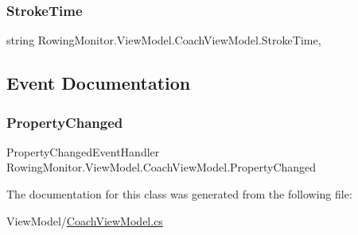 \subsubsection{\texorpdfstring{Stroke\+Time}{StrokeTime}}
{\footnotesize\ttfamily string Rowing\+Monitor.\+View\+Model.\+Coach\+View\+Model.\+Stroke\+Time\hspace{0.3cm}{\ttfamily [get]}, {\ttfamily [set]}}



\subsection{Event Documentation}
\mbox{\label{class_rowing_monitor_1_1_view_model_1_1_coach_view_model_ab3364d1cd88e9e02b866ae2a7f3fe688}} 
\subsubsection{\texorpdfstring{Property\+Changed}{PropertyChanged}}
{\footnotesize\ttfamily Property\+Changed\+Event\+Handler Rowing\+Monitor.\+View\+Model.\+Coach\+View\+Model.\+Property\+Changed}



The documentation for this class was generated from the following file\+:\begin{DoxyCompactItemize}
\item 
View\+Model/\hyperlink{_coach_view_model_8cs}{Coach\+View\+Model.\+cs}\end{DoxyCompactItemize}
